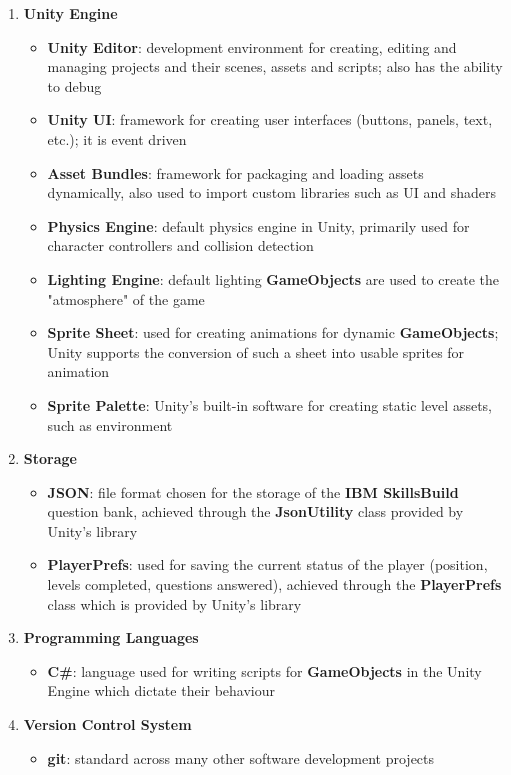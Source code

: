 \documentclass[11pt, a4paper]{article}
\begin{document}
\begin{enumerate}
    \item \textbf{Unity Engine}
    \begin{itemize}
        \item \textbf{Unity Editor}: development environment for creating, editing and managing projects and their scenes, assets and scripts; also has the ability to debug
        \item \textbf{Unity UI}: framework for creating user interfaces (buttons, panels, text, etc.); it is event driven
        \item \textbf{Asset Bundles}: framework for packaging and loading assets dynamically, also used to import custom libraries such as UI and shaders
        \item \textbf{Physics Engine}: default physics engine in Unity, primarily used for character controllers and collision detection
        \item \textbf{Lighting Engine}: default lighting \textbf{GameObjects} are used to create the "atmosphere" of the game
        \item \textbf{Sprite Sheet}: used for creating animations for dynamic \textbf{GameObjects}; Unity supports the conversion of such a sheet into usable sprites for animation
        \item \textbf{Sprite Palette}: Unity's built-in software for creating static level assets, such as environment
    \end{itemize}
    \item \textbf{Storage}
    \begin{itemize}
        \item \textbf{JSON}: file format chosen for the storage of the \textbf{IBM SkillsBuild} question bank, achieved through the \textbf{JsonUtility} class provided by Unity's library
        \item \textbf{PlayerPrefs}: used for saving the current status of the player (position, levels completed, questions answered), achieved through the \textbf{PlayerPrefs} class which is provided by Unity's library
    \end{itemize}
    \item \textbf{Programming Languages}
    \begin{itemize}
        \item \textbf{C\#}: language used for writing scripts for \textbf{GameObjects} in the Unity Engine which dictate their behaviour
    \end{itemize}
    \item \textbf{Version Control System}
    \begin{itemize}
        \item \textbf{git}: standard across many other software development projects
    \end{itemize}
\end{enumerate}
\end{document}
